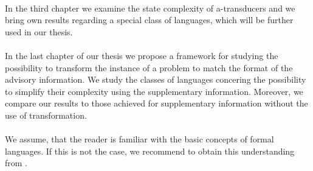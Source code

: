 \paragraph{}
In the third chapter we examine the state complexity of a-transducers and we bring own results regarding a special class of languages, which will be further used in our thesis. 

\paragraph{}
In the last chapter of our thesis we propose a framework for studying the possibility to transform the instance of a problem to match the format of the advisory information. We study the classes of languages concering the possibility to simplify their complexity using the supplementary information. Moreover, we compare our results to those achieved for supplementary information without the use of transformation.

\paragraph{}
We assume, that the reader is familiar with the basic concepts of formal languages. If this is not the case, we recommend to obtain this understanding from \cite{hopcroft:fola}.
